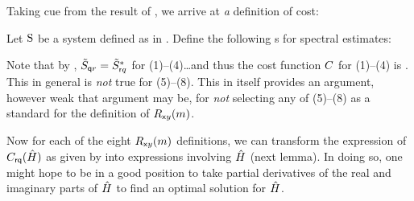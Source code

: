 Taking cue from the result of , we arrive at \emph{a} definition of cost:

\begin{definition}
\label{def:fCost}
Let $\operatorname{S}$ be a system defined as in .
Define the following s for spectral  estimates:
\end{definition}

\begin{remark}
Note that by , $\tilde{S}_{{\mathsf qr}}=\tilde{S}_{{\mathsf rq}}^\ast$ for (1)--(4)\ldots and thus
the cost function $C$ for (1)--(4) is .
This in general is \emph{not} true for (5)--(8).
This in itself provides an argument, however weak that argument may be,
for \emph{not} selecting any of (5)--(8) as a standard for the definition of $R_{{\mathsf xy}}(m)$.
\end{remark}

Now for each of the eight $R_{{\mathsf xy}}(m)$ definitions, we can transform the expression of $C_{\mathsf{rq}}(\hat{H})$
as given by  into expressions involving $\hat{H}$ (next lemma).
In doing so, one might hope to be in a good position to take partial derivatives of the real and imaginary parts of $\hat{H}$
to find an optimal  solution for $\hat{H}$.

